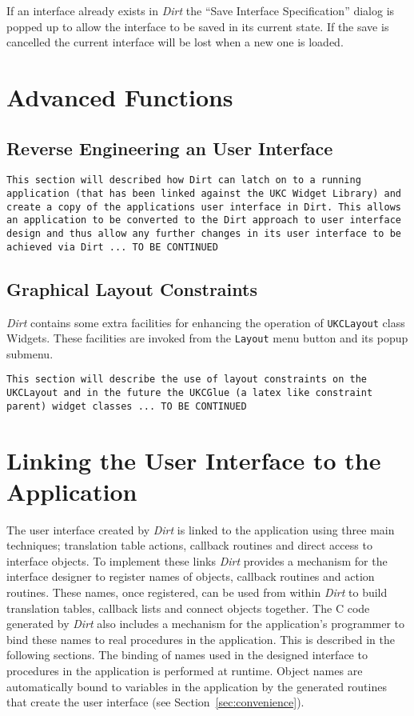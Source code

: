 If an interface already exists in {\em Dirt} the
``Save Interface Specification'' dialog is popped up to allow the interface
to be saved in its current state.  If the save is cancelled the current
interface will be lost when a new one is loaded.

\section{Advanced Functions}
\subsection{Reverse Engineering an User Interface}
{\tt This section will described how Dirt can latch on to a running
application (that has been linked against the UKC Widget Library) and
create a copy of the applications user interface in Dirt.
This allows an application to be converted to the Dirt approach to user
interface design and thus allow any further changes in its user interface
to be achieved via Dirt ... TO BE CONTINUED}

\subsection{Graphical Layout Constraints}
{\em Dirt} contains some extra facilities for enhancing the operation of
{\tt UKCLayout} class Widgets.  These facilities are invoked from the
{\tt Layout} menu button and its popup submenu.  

{\tt This section will describe the use of layout constraints on the
UKCLayout and in the future the UKCGlue (a latex like constraint parent)
widget classes ... TO BE CONTINUED}

\section{Linking the User Interface to the Application}
\label{sec:linking-to-app}
The user interface created by {\em Dirt} is linked to the application using
three main techniques; translation table actions, callback routines and
direct access to interface objects.  To implement these links {\em Dirt}
provides a mechanism for the interface designer to register names of objects,
callback routines and action routines.  These names, once registered, can be
used from within {\em Dirt} to build translation tables, callback lists and
connect objects together.  The C code generated by {\em Dirt} also includes a
mechanism for the application's programmer to bind these names to real
procedures in the application.  This is described in the following sections.
The binding of names used in the designed interface to procedures in the
application is performed at runtime.  Object names are automatically bound to
variables in the application by the generated routines that create the user
interface (see Section~\ref{sec:convenience}).


